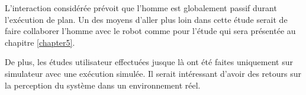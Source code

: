\documentclass[a4paper,11pt,twoside]{StyleThese}
\begin{document}
L'interaction considérée prévoit que l'homme est globalement passif durant l'exécution de plan. Un des moyens d'aller plus loin dans cette étude serait de faire collaborer l'homme avec le robot comme pour l'étude qui sera présentée au chapitre \ref{chapter5}.

De plus, les études utilisateur effectuées jusque là ont été faites uniquement sur simulateur avec une exécution simulée. Il serait intéressant d'avoir des retours sur la perception du système dans un environnement réel. 










\ifdefined{}
\else


\end{document}
